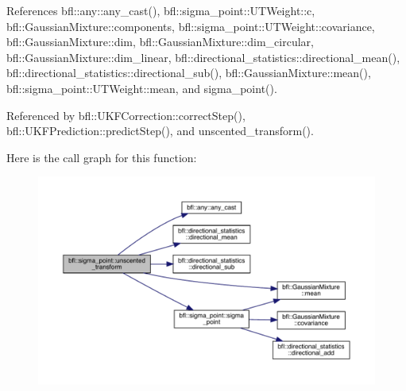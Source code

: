 References bfl\+::any\+::any\+\_\+cast(), bfl\+::sigma\+\_\+point\+::\+U\+T\+Weight\+::c, bfl\+::\+Gaussian\+Mixture\+::components, bfl\+::sigma\+\_\+point\+::\+U\+T\+Weight\+::covariance, bfl\+::\+Gaussian\+Mixture\+::dim, bfl\+::\+Gaussian\+Mixture\+::dim\+\_\+circular, bfl\+::\+Gaussian\+Mixture\+::dim\+\_\+linear, bfl\+::directional\+\_\+statistics\+::directional\+\_\+mean(), bfl\+::directional\+\_\+statistics\+::directional\+\_\+sub(), bfl\+::\+Gaussian\+Mixture\+::mean(), bfl\+::sigma\+\_\+point\+::\+U\+T\+Weight\+::mean, and sigma\+\_\+point().



Referenced by bfl\+::\+U\+K\+F\+Correction\+::correct\+Step(), bfl\+::\+U\+K\+F\+Prediction\+::predict\+Step(), and unscented\+\_\+transform().

Here is the call graph for this function\+:
\nopagebreak
\begin{figure}[H]
\begin{center}
\leavevmode
\includegraphics[width=350pt]{namespacebfl_1_1sigma__point_afe170453152d4f96db4dad71bd9be9a3_cgraph}
\end{center}
\end{figure}
\mbox{\label{namespacebfl_1_1sigma__point_a49b40777ee901dfbe3752e8f165fb439}} 
